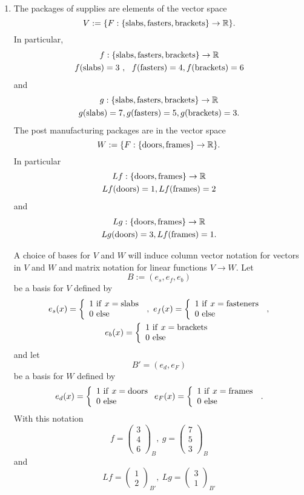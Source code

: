 \documentclass[12pt]{article}
\def\R{{\mathbb{R}}}
\def\bv{\left(\begin{array}{c}}
\def\ev{\end{array}\right) }
\begin{document}
\begin{enumerate}
\begin{enumerate}
\item 
The packages of supplies are elements of the vector space 
\[ V:=\{  F: \{ {\rm slabs, fasters,brackets }\} \to \R \}.\]
In particular, 
\begin{gather*} f: \{ {\rm slabs, fasters,brackets }\} \to \R \\
f({\rm slabs})=3~,~~f({\rm fasters})=4, f({\rm brackets})= 6\end{gather*}
and
\begin{gather*} g: \{ {\rm slabs, fasters,brackets} \} \to \R \\
g({\rm slabs})=7,g({\rm fasters})=5, g({\rm brackets})= 3. \end{gather*}
The post manufacturing packages are  in the vector space 
\[W :=\{ F: \{{\rm doors, frames} \}\to \R\} .\]
In particular
\begin{gather*}Lf:  \{{\rm doors, frames }\} \to \R \\
Lf({\rm doors})=1,Lf({\rm frames})=2 \end{gather*}
and
\begin{gather*}Lg:  \{{\rm doors, frames} \} \to \R \\
Lg({\rm doors})=3,Lf({\rm frames})=1.\end{gather*}

A choice of bases for $V$ and $W$ will induce column vector notation for vectors in $V$ and $W$ and  matrix notation for linear functions $V\to W$. 
Let 
\[B:=( e_s,e_f,e_b)\] 
be a basis for $V$ defined by 
\begin{gather*}
e_s(x)=\left\{ \begin{array}{l} 1 {\rm ~if~} x={\rm slabs}\\ 0 {\rm ~else~} \end{array} \right.\, , ~
e_f(x)=\left\{ \begin{array}{l} 1 {\rm ~if~} x={\rm fasteners}\\ 0 {\rm{~else~}} \end{array} \right.\, , \\
e_b(x)=\left\{ \begin{array}{l} 1 {\rm ~if~} x={\rm brackets} \\ 0 {\rm ~else~} \end{array} \right.
\end{gather*}
and let 
\[B'= ( e_d,e_F)\]
be a basis for $W$ defined by
\[
e_d(x)=\left\{ \begin{array}{l} 1 {\rm ~if~} x={\rm doors}\\ 0 {\rm ~else~} \end{array}\right.
e_F(x)=\left\{ \begin{array}{l} 1 {\rm ~if~} x={\rm frames}\\ 0 {\rm ~else~} \end{array} \right. \, .
\]
With this notation 
\[f= \bv 3\\4\\6 \ev_B ,~g= \bv 7\\5\\3 \ev_B\]
and
\[ Lf=\bv 1\\2\ev _{B'} , ~Lg=\bv3\\1 \ev _{B'}\]


\end{enumerate}
\end{enumerate}
\end{document}
